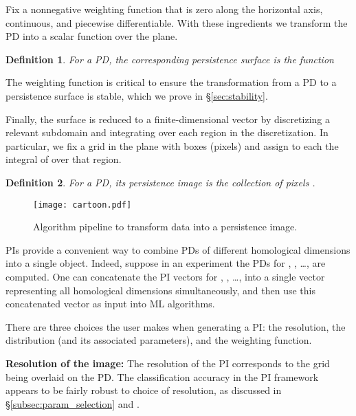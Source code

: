 \documentclass[11pt]{article}
\newtheorem{definition}{Definition}
\begin{document}
 

\noindent Fix a nonnegative weighting function  that is zero along the horizontal axis, continuous, and piecewise differentiable. With these ingredients we transform the PD into a scalar function over the plane.

\begin{definition}
For  a PD, the corresponding \emph{persistence surface}  is the function  

\end{definition}
The weighting function  is critical to ensure the transformation from a PD to a persistence surface is stable, which we prove in \S\ref{sec:stability}.

Finally, the surface  is reduced to a finite-dimensional vector by discretizing a relevant subdomain and integrating  over each region in the discretization. In particular, we fix a grid in the plane with  boxes (pixels) and assign to each the integral of  over that region. 

\begin{definition}
For  a PD, its \emph{persistence image} is the collection of pixels .
\end{definition}

\begin{figure}
\begin{centering}
\texttt{[image: cartoon.pdf]}
\caption{Algorithm pipeline to transform data into a persistence image.}
\label{fig:pipeline}
\end{centering}
\end{figure}


PIs provide a convenient way to combine PDs of different homological dimensions into a single object. Indeed, suppose in an experiment the PDs for , , \ldots,  are computed. One can concatenate the PI vectors for , , \ldots,  into a single vector representing all homological dimensions simultaneously, and then use this concatenated vector as input into ML algorithms.  

There are three choices the user makes when generating a PI: the resolution, the distribution  (and its associated parameters), and the weighting function. 

\textbf{Resolution of the image:} The resolution of the PI corresponds to the grid being overlaid on the PD. The classification accuracy in the PI framework appears to be fairly robust to choice of resolution, as discussed in \S\ref{subsec:param_selection} and \citep{zeppelzauer2016topological}.
\end{document}

